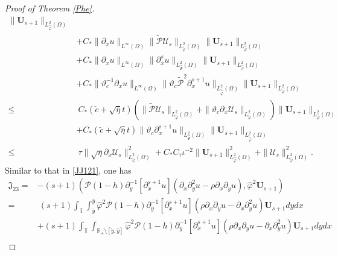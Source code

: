 \documentclass{amsart}
\numberwithin{equation}{section}
\begin{document}
\begin{proof}[Proof of Theorem \ref{Phe}]
\begin{align}
       \|\mathbf{U}_{s+1}\|_{L_{\hat{\varphi}}^{2}(\Omega)}\nonumber\\
    &+C_{*}\|\partial_{x}u\|_{L^{\infty}(\Omega)}
           \|\tilde{\mathcal{P}}\mathcal{U}_{s}\|_{L_{\tilde{\varphi}}^{2}(\Omega)}
           \|\mathbf{U}_{s+1}\|_{L_{\hat{\varphi}}^{2}(\Omega)}\nonumber\\
    &+C_{*}\|\partial_{x}u\|_{L^{\infty}(\Omega)}
           \|\partial_{x}^{s}u\|_{L_{\hat{\Psi}}^{2}(\Omega)}
           \|\mathbf{U}_{s+1}\|_{L_{\hat{\varphi}}^{2}(\Omega)}\nonumber\\
    &+C_{*}\|\vartheta_{c}^{-1}\partial_{x}u\|_{L^{\infty}(\Omega)}
           \|\vartheta_{c}\tilde{\mathcal{P}}^{2}\partial_{x}^{s+1}u\|_{L_{\tilde{\hat{\varphi}}}^{2}(\Omega)}
           \|\mathbf{U}_{s+1}\|_{L_{\hat{\varphi}}^{2}(\Omega)}\nonumber\\
\leq&~C_{*}(\check{c}+\sqrt{\bar{\eta}}t)
      \left(\|\tilde{\mathcal{P}}\mathcal{U}_{s}\|_{L_{\tilde{\varphi}}^{2}(\Omega)}
            +\|\vartheta_{c}\partial_{x}\mathcal{U}_{s}\|_{L_{\tilde{\varphi}}^{2}(\Omega)}\right)
      \|\mathbf{U}_{s+1}\|_{L_{\hat{\varphi}}^{2}(\Omega)}\nonumber\\
    &+C_{*}(\check{c}+\sqrt{\bar{\eta}}t)
      \|\vartheta_{c}\partial_{x}^{s+1}u\|_{L_{\hat{\Psi}}^{2}(\Omega)}\|\mathbf{U}_{s+1}\|_{L_{\tilde{\hat{\varphi}}}^{2}(\Omega)}\nonumber\\
\leq&~\tau\|\sqrt{\eta}\partial_{x}\mathcal{U}_{s}\|_{L_{\tilde{\varphi}}^{2}(\Omega)}^{2}
     +C_{*}C_{\tau}\iota^{-2}\|\mathbf{U}_{s+1}\|_{L_{\hat{\varphi}}^{2}(\Omega)}^{2}
     +\|\mathcal{U}_{s}\|_{L_{\tilde{\varphi}}^{2}(\Omega)}^{2}.\nonumber
\end{align}
Similar to that in \eqref{JJ121}, one has
\begin{align}\label{JJ23}
\mathfrak{J}_{23}
=&-(s+1)(\mathcal{P}(1-h)\partial_{y}^{-1}[\partial_{x}^{s+1}u](\partial_{x}\partial_{y}^{2}u-\rho\partial_{x}\partial_{y}u),\hat{\varphi}^{2}\mathbf{U}_{s+1})\\
=&~(s+1)\int_{\mathbb{T}}\int_{\check{y}}^{\hat{y}}\hat{\varphi}^{2}\mathcal{P}(1-h)\partial_{y}^{-1}[\partial_{x}^{s+1}u](\rho\partial_{x}\partial_{y}u-\partial_{x}\partial_{y}^{2}u)\mathbf{U}_{s+1}dydx\nonumber\\
 &+(s+1)\int_{\mathbb{T}}\int_{\mathbb{R}_{+}\setminus[\check{y},\hat{y}]}\hat{\varphi}^{2}\mathcal{P}(1-h)\partial_{y}^{-1}[\partial_{x}^{s+1}u](\rho\partial_{x}\partial_{y}u-\partial_{x}\partial_{y}^{2}u)\mathbf{U}_{s+1}dydx\nonumber\\

\end{align}
\end{proof}
\end{document}
